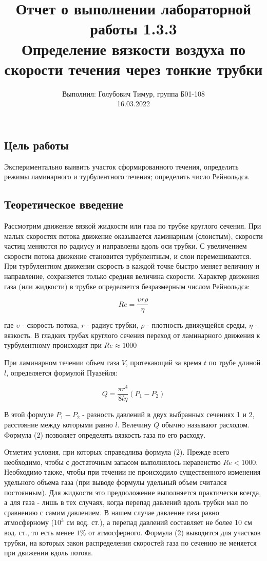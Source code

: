 \documentclass[12pt,a4paper]{article}
\author{\normalsize Выполнил: Голубович Тимур, группа Б01-108 \\
	\normalsize 16.03.2022}
\date{}
\title
{
	\large Отчет о выполнении лабораторной работы 1.3.3 \\
	\Large Определение вязкости воздуха по скорости течения через тонкие трубки \\ 
}
\begin{document}
	\maketitle
	
	\subsection*{Цель работы} Экспериментально выявить участок сформированного течения, определить режимы ламинарного и турбулентного течения; определить число Рейнольдса.
	
	\subsection*{Теоретическое введение}
	Рассмотрим движение вязкой жидкости или газа по трубке круглого сечения. При малых скоростях потока движение оказывается ламинарным (слоистым), скорости частиц меняются по радиусу и направлены вдоль оси трубки. С увеличением скорости потока движение становится турбулентным, и слои перемешиваются. При турбулентном движении скорость в каждой точке быстро меняет величину и направление, сохраняется только средняя величина скорости.
	Характер движения газа (или жидкости) в трубке определяется безразмерным числом Рейнольдса:
	
	\begin{equation}
		Re = \dfrac{\upsilon r \rho}{\eta}
	\end{equation}
	
	где $\upsilon$ - скорость потока, $r$ - радиус трубки, $\rho$ - плотность движущейся среды, $\eta$ - вязкость. В гладких трубах круглого сечения переход от ламинарного движения к турбулентному происходит при $Re \approx 1000$
	
	При ламинарном течении объем газа $V$, протекающий за время $t$ по трубе длиной $l$, определяется формулой Пуазейля:
	
	\begin{equation} \label{form:QP}
		Q = \dfrac{\pi r^4}{8 l \eta}(P_1 - P_2)
	\end{equation}

	В этой формуле $P_1 - P_2$ - разность давлений в двух выбранных сечениях 1 и 2, расстояние между которыми равно $l$. Велечину $Q$ обычно называют расходом. Формула (2) позволяет определять вязкость газа по его расходу.
	
	Отметим условия, при которых справедлива формула (2). Прежде всего необходимо, чтобы с достаточным запасом выполнялось неравенство $Re < 1000$. Необходимо также, чтобы при течении не происходило существенного изменения удельного объема газа (при выводе формулы удельный объем считался постоянным). Для жидкости это предположение выполняется практически всегда, а для газа - лишь в тех случаях, когда перепад давлений вдоль трубки мал по сравнению с самим давлением. В нашем случае давление газа равно атмосферному ($10^3$ см вод. ст.), а перепад давлений составляет не более 10 см вод. ст., то есть менее $1\%$ от атмосферного. Формула (2) выводится для участков трубки, на которых закон распределения скоростей газа по сечению не меняется при движении вдоль потока.
	
\end{document}
